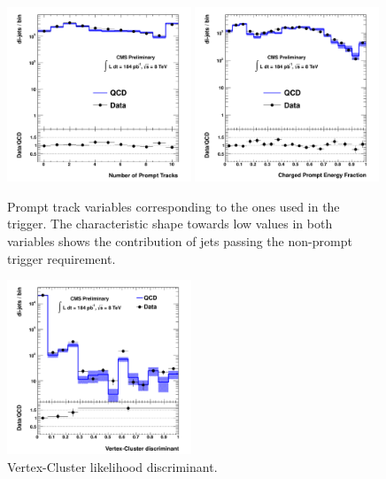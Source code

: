 \begin{figure}[htbp]
\centering
\includegraphics[width=0.49\textwidth]{plots/control/ctrl_NPromptTracks.pdf}
\includegraphics[width=0.49\textwidth]{plots/control/ctrl_PromptEnergyFrac.pdf}

\caption{Prompt track variables corresponding to the ones used in the trigger. 
The characteristic shape towards low values in both variables
shows the contribution of jets passing the non-prompt trigger requirement. \label{fig:promptness}}
\end{figure}

\begin{figure}[htbp]
\centering
\includegraphics[width=0.49\textwidth]{plots/control/ctrl_Discriminant.pdf}
\caption{Vertex-Cluster likelihood discriminant.\label{fig:discriminant}}
\end{figure}

